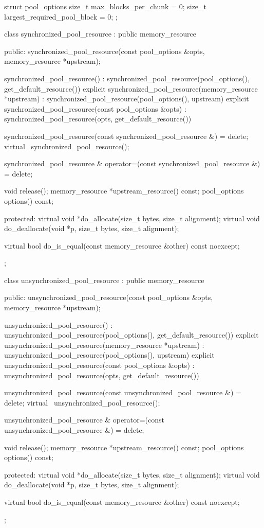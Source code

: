 %
%
%
\begin{codeblock}
struct pool_options {
  size_t max_blocks_per_chunk = 0;
  size_t largest_required_pool_block = 0;
};

class synchronized_pool_resource : public memory_resource {
public:
  synchronized_pool_resource(const pool_options &opts,
                             memory_resource *upstream);

  synchronized_pool_resource()
      : synchronized_pool_resource(pool_options(), get_default_resource()) {}
  explicit synchronized_pool_resource(memory_resource *upstream)
      : synchronized_pool_resource(pool_options(), upstream) {}
  explicit synchronized_pool_resource(const pool_options &opts)
      : synchronized_pool_resource(opts, get_default_resource()) {}

  synchronized_pool_resource(const synchronized_pool_resource &) = delete;
  virtual ~synchronized_pool_resource();

  synchronized_pool_resource &
    operator=(const synchronized_pool_resource &) = delete;

  void release();
  memory_resource *upstream_resource() const;
  pool_options options() const;

protected:
  virtual void *do_allocate(size_t bytes, size_t alignment);
  virtual void do_deallocate(void *p, size_t bytes, size_t alignment);

  virtual bool do_is_equal(const memory_resource &other) const noexcept;
};

class unsynchronized_pool_resource : public memory_resource {
public:
  unsynchronized_pool_resource(const pool_options &opts,
                               memory_resource *upstream);

  unsynchronized_pool_resource()
      : unsynchronized_pool_resource(pool_options(), get_default_resource()) {}
  explicit unsynchronized_pool_resource(memory_resource *upstream)
      : unsynchronized_pool_resource(pool_options(), upstream) {}
  explicit unsynchronized_pool_resource(const pool_options &opts)
      : unsynchronized_pool_resource(opts, get_default_resource()) {}

  unsynchronized_pool_resource(const unsynchronized_pool_resource &) = delete;
  virtual ~unsynchronized_pool_resource();

  unsynchronized_pool_resource &
    operator=(const unsynchronized_pool_resource &) = delete;

  void release();
  memory_resource *upstream_resource() const;
  pool_options options() const;

protected:
  virtual void *do_allocate(size_t bytes, size_t alignment);
  virtual void do_deallocate(void *p, size_t bytes, size_t alignment);

  virtual bool do_is_equal(const memory_resource &other) const noexcept;
};
\end{codeblock}

